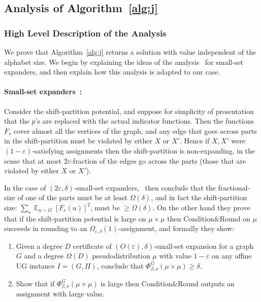 \documentclass[11pt]{article}
\DeclareMathOperator*{\E}{\mathbb{E}}
\def \eps {{\varepsilon}}
\theoremstyle{definition}
\begin{document}
\subsection{Analysis of Algorithm~\ref{alg:j}}
\subsubsection{High Level Description of the Analysis}
We prove that Algorithm~\ref{alg:j} returns a solution with value independent of the alphabet size. We begin by explaining the ideas of the analysis~\cite{BBKSS} for small-set expanders, and then 
explain how this analysis is adapted to our case.

\paragraph{Small-set expanders~\cite{BBKSS}:} 
Consider the shift-partition potential, 
and suppose for simplicity of presentation that the $p$'s are replaced with the actual indicator functions. 
Then the functions $F_s$ cover 
almost all the vertices of the graph, 
and any edge that goes across parts in the shift-partition must be violated by either $X$ or $X'$. Hence if $X,X'$ were $(1-\eps)$-satisfying assignments then the shift-partition is non-expanding, in the sense that at most $2\eps$-fraction of the edges go across the parts (those that are violated 
by either $X$ or $X'$). 

In the case of $(2\eps,\delta)$-small-set expanders,~\cite{BBKSS} then conclude that the fractional-size of one of the parts must be at least $\Omega(\delta)$, and in fact the shift-partition size: $\sum_s \E_{u \sim G}[F_s(u)]^2$, must be $\geq \Omega(\delta)$. On the other hand they prove that if the shift-partition potential is large on $\mu \times \mu$ then Condition\&Round on $\mu$ succeeds in rounding to an $\Omega_{\eps,\delta}(1)$-assignment, 
and formally they show:
\begin{enumerate}
\item Given a degree $D$ certificate of $(O(\eps),\delta)$-small-set expansion for a graph $G$ and a degree $\Omega(D)$ pseudodistribution $\mu$ with value $1-\eps$ on any affine UG instance $I = (G,\Pi)$, conclude that $\Phi^G_{\beta,\nu}(\mu \times \mu) \geq \delta$.
\item Show that if $\Phi^G_{\beta,\nu}(\mu \times \mu)$ is large then Condition\&Round outputs an assignment with large value.
\end{enumerate}
\end{document}

